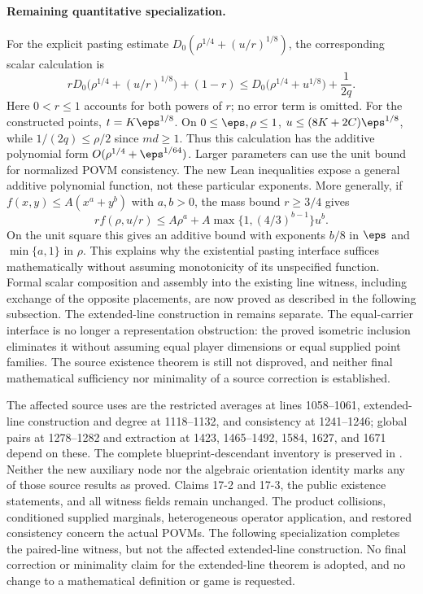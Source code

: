 \documentclass[11pt]{article}
\begin{document}
\paragraph{Remaining quantitative specialization.}
For the explicit pasting estimate $D_0(\rho^{1/4}+(u/r)^{1/8})$, the
corresponding scalar calculation is
\[
 rD_0\bigl(\rho^{1/4}+(u/r)^{1/8}\bigr)+(1-r)
 \le D_0\bigl(\rho^{1/4}+u^{1/8}\bigr)+\frac1{2q}.
\]
Here $0<r\le1$ accounts for both powers of $r$; no error term is omitted.
For the constructed points, $t=K\eps^{1/8}$. On $0\le\eps,\rho\le1$,
$u\le(8K+2C)\eps^{1/8}$, while $1/(2q)\le\rho/2$ since $md\ge1$.
Thus this calculation has the additive polynomial form
$O(\rho^{1/4}+\eps^{1/64})$. Larger parameters can use the unit bound for
normalized POVM consistency. The new Lean inequalities expose a general
additive polynomial function, not these particular exponents. More generally,
if $f(x,y)\le A(x^a+y^b)$ with $a,b>0$, the mass bound $r\ge3/4$
gives
\[
 r f(\rho,u/r)\le
 A\rho^a+A\max\{1,(4/3)^{b-1}\}u^b.
\]
On the unit square this gives an additive bound with exponents
$b/8$ in $\eps$ and $\min\{a,1\}$ in $\rho$. This explains why the
existential pasting interface suffices mathematically without assuming
monotonicity of its unspecified function. Formal scalar composition and
assembly into the existing line witness, including exchange of the opposite
placements, are now proved as described in the following subsection. The
extended-line construction in  remains separate.
The equal-carrier interface is no longer a
representation obstruction: the proved isometric inclusion eliminates it
without assuming equal player dimensions or equal supplied point families.
The source existence theorem is still not disproved, and neither final
mathematical sufficiency nor minimality of a source correction is established.

The affected source uses are the restricted averages at lines 1058--1061,
extended-line construction and degree at 1118--1132, and consistency at
1241--1246; global pairs at 1278--1282 and extraction at 1423, 1465--1492,
1584, 1627, and 1671 depend on these. The complete blueprint-descendant
inventory is preserved in
.
Neither the new auxiliary node nor the algebraic orientation identity marks
any of those source results as proved. Claims 17-2 and 17-3, the public
existence statements, and all witness fields remain unchanged.
The product collisions, conditioned supplied marginals, heterogeneous
operator application, and restored consistency concern the actual POVMs.
The following specialization completes the paired-line witness, but not
the affected extended-line construction. No final correction or minimality
claim for the extended-line theorem is adopted, and no change to a
mathematical definition or game is requested.
\end{document}
